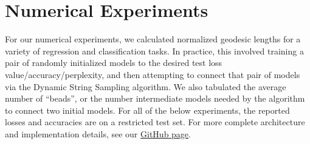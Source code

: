 
 
 
 
 
\section{Numerical Experiments}
\label{sec:NumExp}

For our numerical experiments, we calculated normalized geodesic lengths for a variety of regression and classification tasks.  In practice, this involved training a pair of randomly initialized models to the desired test loss value/accuracy/perplexity, and then attempting to connect that pair of models via the Dynamic String Sampling algorithm.  We also tabulated the average number of ``beads'', or the number intermediate models needed by the algorithm to connect two initial models.  For all of the below experiments, the reported losses and accuracies are on a restricted test set.  For more complete architecture and implementation details, see our \href{github.com/danielfreeman11/convex-nets}{GitHub page}.



